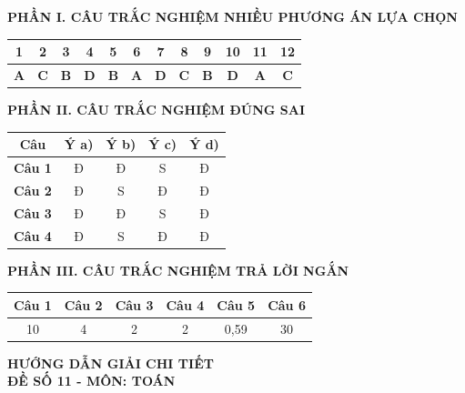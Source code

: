 \documentclass[12pt,a4paper]{article}
\begin{document}
\noindent\textbf{\large PHẦN I. CÂU TRẮC NGHIỆM NHIỀU PHƯƠNG ÁN LỰA CHỌN}
\begin{center}
\renewcommand{\arraystretch}{1.25}
\begin{tabular}{|c|c|c|c|c|c|c|c|c|c|c|c|}
\hline
\textbf{1} & \textbf{2} & \textbf{3} & \textbf{4} & \textbf{5} & \textbf{6} & \textbf{7} & \textbf{8} & \textbf{9} & \textbf{10} & \textbf{11} & \textbf{12} \\ \hline
\textbf{A} & \textbf{C} & \textbf{B} & \textbf{D} & \textbf{B} & \textbf{A} & \textbf{D} & \textbf{C} & \textbf{B} & \textbf{D} & \textbf{A} & \textbf{C} \\ \hline
\end{tabular}
\end{center}

\vspace{0.3cm}
\noindent\textbf{\large PHẦN II. CÂU TRẮC NGHIỆM ĐÚNG SAI}
\begin{center}
\renewcommand{\arraystretch}{1.25}
\begin{tabular}{|c|c|c|c|c|}
\hline
\textbf{Câu} & \textbf{Ý a)} & \textbf{Ý b)} & \textbf{Ý c)} & \textbf{Ý d)} \\ \hline
\textbf{Câu 1} & Đ & Đ & S & Đ \\ \hline
\textbf{Câu 2} & Đ & S & Đ & Đ \\ \hline
\textbf{Câu 3} & Đ & Đ & S & Đ \\ \hline
\textbf{Câu 4} & Đ & S & Đ & Đ \\ \hline
\end{tabular}
\end{center}

\vspace{0.3cm}
\noindent\textbf{\large PHẦN III. CÂU TRẮC NGHIỆM TRẢ LỜI NGẮN}
\begin{center}
\renewcommand{\arraystretch}{1.25}
\begin{tabular}{|c|c|c|c|c|c|}
\hline
\textbf{Câu 1} & \textbf{Câu 2} & \textbf{Câu 3} & \textbf{Câu 4} & \textbf{Câu 5} & \textbf{Câu 6} \\ \hline
10 & 4 & 2 & 2 & 0,59 & 30 \\ \hline
\end{tabular}
\end{center}

\newpage
\begin{center}
    {\Large\textbf{HƯỚNG DẪN GIẢI CHI TIẾT}}\\[4pt]
    \textbf{ĐỀ SỐ 11 - MÔN: TOÁN}
\end{center}
\vspace{0.3cm}
\end{document}
